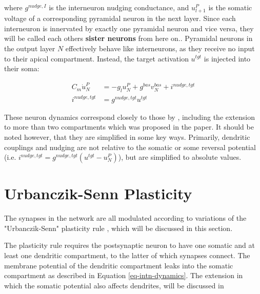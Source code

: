 where $ g^{nudge, I}$ is the interneuron nudging conductance, and $u_{l+1}^P$ is the somatic voltage of a corresponding
pyramidal neuron in the next layer. Since each interneuron is innervated by exactly one pyramidal neuron and vice versa,
they will be called each others \textbf{sister neurons} from here on.. Pyramidal neurons in the output layer $N$ effectively behave like interneurons, as they receive no input
to their apical compartment. Instead, the target  activation $u^{tgt}$ is injected into their soma:

\begin{align}
  C_m \dot{u}_N^P & = - g_l u_N^{P} + g^{bas} v_N^{bas} + i^{nudge, tgt} \\
  i^{nudge, tgt}  & = g^{nudge, tgt} u^{tgt}
\end{align}


These neuron dynamics correspond closely to those by \cite{urbanczik2014learning}, including the extension to more than
two compartments which was proposed in the paper. It should be noted however, that they are simplified in some key ways.
Primarily, dendritic couplings and nudging are not relative to the somatic or some reversal potential (i.e. $i^{nudge,
      tgt}= g^{nudge, tgt} (u^{tgt} - u_N^P )$), but are simplified to absolute values. 








\section{Urbanczik-Senn Plasticity}\label{sec-urb-senn-plast}

The synapses in the network are all modulated according to variations of the "Urbanczik-Senn" plasticity rule
\citep{urbanczik2014learning}, which will be discussed in this section. 

The plasticity rule requires the postsynaptic neuron to have one somatic and at least one dendritic compartment, to the
latter of which synapses connect. The membrane potential of the dendritic compartment leaks into the somatic compartment
as described in Equation \ref{eq-intn-dynamics}. The extension in which the somatic potential also affects dendrites,
will be discussed in



